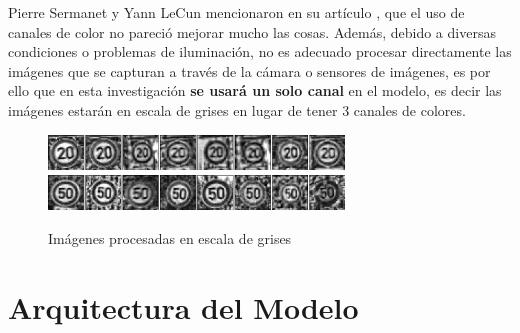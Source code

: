 		Pierre Sermanet y Yann LeCun mencionaron en su artículo \citep{LeCun}, que el uso de canales de color no pareció mejorar mucho las cosas. Además, debido a diversas condiciones o problemas de iluminación, no es adecuado procesar directamente las imágenes que se capturan a través de la cámara o sensores de imágenes, es por ello que en esta investigación {\bf se usará un solo canal} en el modelo, es decir las imágenes estarán en escala de grises en lugar de tener 3 canales de colores.
		
			\begin{figure}[H]
			\begin{center}
			\includegraphics[width=0.7\textwidth]{images/desarrollo/Normalization_Processing/proc_test1}
			\includegraphics[width=0.7\textwidth]{images/desarrollo/Normalization_Processing/proc_test2}
			\end{center}
			\begin{center}
			\caption{\small{Imágenes procesadas en escala de grises}}
			
			{\small{\fontsize{10}{16.8}\selectfont {Fuente: Elaboración propia}}}
			\end{center}
			\vspace{-1.5em}
			\end{figure}
			\newpage
	

\section{Arquitectura del Modelo}


